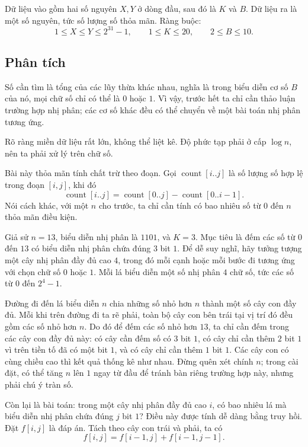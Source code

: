\documentclass[11pt]{article}
\begin{document}
Dữ liệu vào gồm hai số nguyên $X,Y$ ở dòng đầu, sau đó là $K$ và $B$. Dữ liệu
ra là một số nguyên, tức số lượng số thỏa mãn. Ràng buộc:
\[
  1\le X\le Y\le 2^{31}-1,\qquad
  1\le K\le 20,\qquad 2\le B\le 10.
\]

\subsection{Phân tích}

Số cần tìm là tổng của các lũy thừa khác nhau, nghĩa là trong biểu diễn cơ số
$B$ của nó, mọi chữ số chỉ có thể là $0$ hoặc $1$. Vì vậy, trước hết ta chỉ
cần thảo luận trường hợp nhị phân; các cơ số khác đều có thể chuyển về một bài
toán nhị phân tương ứng.

Rõ ràng miền dữ liệu rất lớn, không thể liệt kê. Độ phức tạp phải ở cấp
$\log n$, nên ta phải xử lý trên chữ số.

Bài này thỏa mãn tính chất trừ theo đoạn. Gọi $\operatorname{count}[i..j]$ là
số lượng số hợp lệ trong đoạn $[i,j]$, khi đó
\[
  \operatorname{count}[i..j]
  =\operatorname{count}[0..j]-\operatorname{count}[0..i-1].
\]
Nói cách khác, với một $n$ cho trước, ta chỉ cần tính có bao nhiêu số từ $0$
đến $n$ thỏa mãn điều kiện.

Giả sử $n=13$, biểu diễn nhị phân là $1101$, và $K=3$. Mục tiêu là đếm các số
từ $0$ đến $13$ có biểu diễn nhị phân chứa đúng $3$ bit $1$. Để dễ suy nghĩ,
hãy tưởng tượng một cây nhị phân đầy đủ cao $4$, trong đó mỗi cạnh hoặc mỗi
bước đi tương ứng với chọn chữ số $0$ hoặc $1$. Mỗi lá biểu diễn một số nhị
phân $4$ chữ số, tức các số từ $0$ đến $2^4-1$.

Đường đi đến lá biểu diễn $n$ chia những số nhỏ hơn $n$ thành một số cây con
đầy đủ. Mỗi khi trên đường đi ta rẽ phải, toàn bộ cây con bên trái tại vị trí
đó đều gồm các số nhỏ hơn $n$. Do đó để đếm các số nhỏ hơn $13$, ta chỉ cần
đếm trong các cây con đầy đủ này: có cây cần đếm số có $3$ bit $1$, có cây chỉ
cần thêm $2$ bit $1$ vì trên tiền tố đã có một bit $1$, và có cây chỉ cần thêm
$1$ bit $1$. Các cây con có cùng chiều cao thì kết quả thống kê như nhau.
Đừng quên xét chính $n$; trong cài đặt, có thể tăng $n$ lên $1$ ngay từ đầu để
tránh bàn riêng trường hợp này, nhưng phải chú ý tràn số.

Còn lại là bài toán: trong một cây nhị phân đầy đủ cao $i$, có bao nhiêu lá mà
biểu diễn nhị phân chứa đúng $j$ bit $1$? Điều này được tính dễ dàng bằng truy
hồi. Đặt $f[i,j]$ là đáp án. Tách theo cây con trái và phải, ta có
\[
  f[i,j]=f[i-1,j]+f[i-1,j-1].
\]
\end{document}
